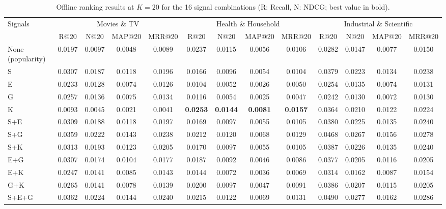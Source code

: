 \documentclass[3p,times,procedia]{elsarticle}
\begin{document}
\begin{table}[!ht]
\centering
\caption{Offline ranking results at $K=20$ for the 16 signal combinations (R: Recall, N: NDCG; best value in bold).}
\label{tab:ablation}
\footnotesize
\setlength{\tabcolsep}{3pt}
\begin{tabular*}{\hsize}{@{\extracolsep{\fill}}lcccccccccccc@{}}
\toprule
Signals & \multicolumn{4}{c}{Movies \& TV} & \multicolumn{4}{c}{Health \& Household} & \multicolumn{4}{c}{Industrial \& Scientific} \\
 & R@20 & N@20 & MAP@20 & MRR@20 & R@20 & N@20 & MAP@20 & MRR@20 & R@20 & N@20 & MAP@20 & MRR@20 \\
\colrule
None (popularity) & 0.0197 & 0.0097 & 0.0048 & 0.0089 & 0.0237 & 0.0115 & 0.0056 & 0.0106 & 0.0282 & 0.0147 & 0.0077 & 0.0150 \\
\colrule
S & 0.0307 & 0.0187 & 0.0118 & 0.0196 & 0.0166 & 0.0096 & 0.0054 & 0.0104 & 0.0379 & 0.0223 & 0.0134 & 0.0238 \\
E & 0.0233 & 0.0128 & 0.0074 & 0.0126 & 0.0104 & 0.0052 & 0.0026 & 0.0050 & 0.0254 & 0.0135 & 0.0074 & 0.0131 \\
G & 0.0257 & 0.0136 & 0.0075 & 0.0134 & 0.0116 & 0.0054 & 0.0025 & 0.0047 & 0.0242 & 0.0130 & 0.0072 & 0.0130 \\
K & 0.0093 & 0.0045 & 0.0021 & 0.0041 & \textbf{0.0253} & \textbf{0.0144} & \textbf{0.0081} & \textbf{0.0157} & 0.0364 & 0.0210 & 0.0122 & 0.0224 \\
\colrule
S+E & 0.0309 & 0.0188 & 0.0118 & 0.0197 & 0.0169 & 0.0097 & 0.0055 & 0.0105 & 0.0380 & 0.0225 & 0.0135 & 0.0240 \\
S+G & 0.0359 & 0.0222 & 0.0143 & 0.0238 & 0.0212 & 0.0120 & 0.0068 & 0.0129 & 0.0468 & 0.0267 & 0.0156 & 0.0278 \\
S+K & 0.0313 & 0.0193 & 0.0123 & 0.0205 & 0.0170 & 0.0097 & 0.0055 & 0.0105 & 0.0387 & 0.0226 & 0.0135 & 0.0240 \\
E+G & 0.0307 & 0.0174 & 0.0104 & 0.0177 & 0.0187 & 0.0092 & 0.0046 & 0.0086 & 0.0377 & 0.0205 & 0.0116 & 0.0205 \\
E+K & 0.0247 & 0.0141 & 0.0085 & 0.0143 & 0.0144 & 0.0072 & 0.0036 & 0.0069 & 0.0314 & 0.0162 & 0.0087 & 0.0154 \\
G+K & 0.0265 & 0.0141 & 0.0078 & 0.0139 & 0.0200 & 0.0097 & 0.0047 & 0.0091 & 0.0386 & 0.0207 & 0.0115 & 0.0205 \\
\colrule
S+E+G & 0.0362 & 0.0224 & 0.0144 & 0.0240 & 0.0215 & 0.0122 & 0.0069 & 0.0131 & 0.0490 & 0.0277 & 0.0162 & 0.0286 \\

\end{tabular*}
\end{table}
\end{document}

